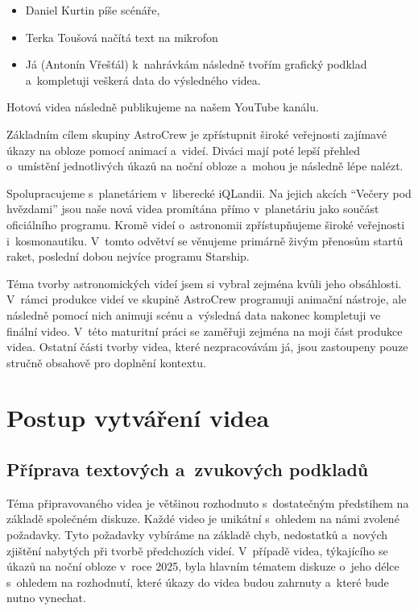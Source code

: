 \documentclass[12pt,a4paper,titlepage]{article}
\begin{document}
\begin{itemize}
	\item Daniel Kurtin píše scénáře,
	\item Terka Toušová načítá text na mikrofon
	\item Já (Antonín Vřešťál) k~nahrávkám následně tvořím grafický podklad a~kompletuji veškerá data do výsledného videa.
\end{itemize}
Hotová videa následně publikujeme na našem YouTube kanálu. 

Základním cílem skupiny AstroCrew je zpřístupnit široké veřejnosti zajímavé úkazy na obloze pomocí animací a~videí. Diváci mají poté lepší přehled o~umístění jednotlivých úkazů na noční obloze a~mohou je následně lépe nalézt.

Spolupracujeme s~planetáriem v~liberecké iQLandii. Na jejich akcích \enquote{Večery pod hvězdami} jsou naše nová videa promítána přímo v~planetáriu jako součást oficiálního programu. Kromě videí o~astronomii zpřístupňujeme široké veřejnosti i~kosmonautiku. V~tomto odvětví se věnujeme primárně živým přenosům startů raket, poslední dobou nejvíce programu Starship.

Téma tvorby astronomických videí jsem si vybral zejména kvůli jeho obsáhlosti. V~rámci produkce videí ve skupině AstroCrew programuji animační nástroje, ale následně pomocí nich animuji scénu a~výsledná data nakonec kompletuji ve finální video. V~této maturitní práci se zaměřuji zejména na moji část produkce videa. Ostatní části tvorby videa, které nezpracovávám já, jsou zastoupeny pouze stručně obsahově pro doplnění kontextu. 
\section{Postup vytváření videa}\label{makingof}
\subsection{Příprava textových a~zvukových podkladů}\label{makingof:text-audio-prep}
Téma připravovaného videa je většinou rozhodnuto s~dostatečným předstihem na základě společném diskuze. Každé video je unikátní s~ohledem na námi zvolené požadavky. Tyto požadavky vybíráme na základě chyb, nedostatků a~nových zjištění nabytých při tvorbě předchozích videí. V~případě videa, týkajícího se úkazů na noční obloze v~roce 2025, byla hlavním tématem diskuze o~jeho délce s~ohledem na rozhodnutí, které úkazy do videa budou zahrnuty a~které bude nutno vynechat.
\end{document}
